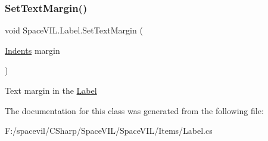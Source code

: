 \subsubsection{\texorpdfstring{Set\+Text\+Margin()}{SetTextMargin()}}
{\footnotesize\ttfamily void Space\+V\+I\+L.\+Label.\+Set\+Text\+Margin (\begin{DoxyParamCaption}\item[{\mbox{\hyperlink{struct_space_v_i_l_1_1_decorations_1_1_indents}{Indents}}}]{margin }\end{DoxyParamCaption})}



Text margin in the \mbox{\hyperlink{class_space_v_i_l_1_1_label}{Label}} 



The documentation for this class was generated from the following file\+:\begin{DoxyCompactItemize}
\item 
F\+:/spacevil/\+C\+Sharp/\+Space\+V\+I\+L/\+Space\+V\+I\+L/\+Items/Label.\+cs\end{DoxyCompactItemize}
